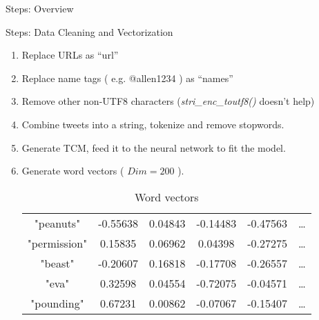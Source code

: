 \documentclass{beamer}
\begin{document}
\begin{frame}{Steps: Overview}
	\begin{center}
	\end{center}
\end{frame}

\begin{frame}{Steps: Data Cleaning and Vectorization}
	\begin{enumerate}
		\item Replace URLs as ``url''
		\item Replace name tags ( e.g. @allen1234 ) as ``names''
		\item Remove other non-UTF8 characters (\textit{stri\_enc\_toutf8()} doesn't help)
		\item Combine tweets into a string, tokenize and remove stopwords.
		\item Generate TCM, feed it to the neural network to fit the model.
		\item Generate word vectors ( $Dim = 200 $ ).
	\begin{table}[htpb]
		\scriptsize
		\centering
		\caption{Word vectors}
		\label{tab:wordVec}
		\begin{tabular}{c | c c c c c}
			"peanuts" & -0.55638 & 0.04843 & -0.14483 & -0.47563 & \ldots \\
			"permission" & 0.15835 & 0.06962 & 0.04398 & -0.27275 & \ldots \\ 
			"beast" & -0.20607 & 0.16818 & -0.17708 & -0.26557 & \ldots \\
			"eva" & 0.32598 & 0.04554 & -0.72075 & -0.04571 & \ldots \\
			"pounding" & 0.67231 & 0.00862 & -0.07067 & -0.15407 & \ldots \\
		\end{tabular}
	\end{table}
	\end{enumerate}
\end{frame}
\end{document}
